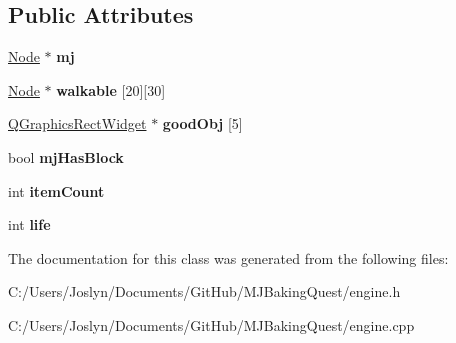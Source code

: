 \subsection*{Public Attributes}
\begin{DoxyCompactItemize}
\item 
\hypertarget{classengine_ab3a51856b749c44d32f45ab4ba653d59}{\hyperlink{class_node}{Node} $\ast$ {\bfseries mj}}\label{classengine_ab3a51856b749c44d32f45ab4ba653d59}

\item 
\hypertarget{classengine_ab994ab325c0c9fa80dea14e935f20d83}{\hyperlink{class_node}{Node} $\ast$ {\bfseries walkable} \mbox{[}20\mbox{]}\mbox{[}30\mbox{]}}\label{classengine_ab994ab325c0c9fa80dea14e935f20d83}

\item 
\hypertarget{classengine_a3f98c76f5a03777bd0e0543dae1c9725}{\hyperlink{class_q_graphics_rect_widget}{Q\-Graphics\-Rect\-Widget} $\ast$ {\bfseries good\-Obj} \mbox{[}5\mbox{]}}\label{classengine_a3f98c76f5a03777bd0e0543dae1c9725}

\item 
\hypertarget{classengine_a66bf076777496c5588df19a7191bbdb4}{bool {\bfseries mj\-Has\-Block}}\label{classengine_a66bf076777496c5588df19a7191bbdb4}

\item 
\hypertarget{classengine_a4a40819a98ac7ab07ce6669a291adfaf}{int {\bfseries item\-Count}}\label{classengine_a4a40819a98ac7ab07ce6669a291adfaf}

\item 
\hypertarget{classengine_a03e0b46f80c31f67235837a8cbb9ee27}{int {\bfseries life}}\label{classengine_a03e0b46f80c31f67235837a8cbb9ee27}

\end{DoxyCompactItemize}


The documentation for this class was generated from the following files\-:\begin{DoxyCompactItemize}
\item 
C\-:/\-Users/\-Joslyn/\-Documents/\-Git\-Hub/\-M\-J\-Baking\-Quest/engine.\-h\item 
C\-:/\-Users/\-Joslyn/\-Documents/\-Git\-Hub/\-M\-J\-Baking\-Quest/engine.\-cpp\end{DoxyCompactItemize}
